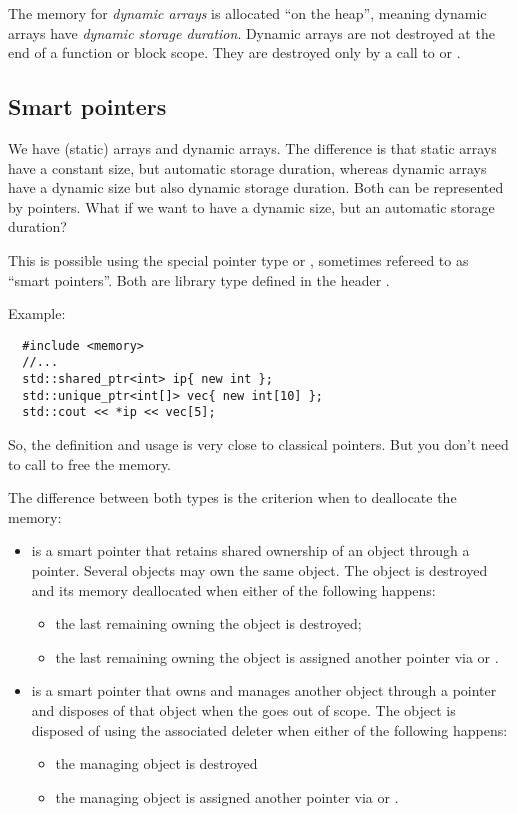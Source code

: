 The memory for \emph{dynamic arrays} is allocated ``on the heap'', meaning dynamic arrays have \emph{dynamic storage duration}. Dynamic arrays are not destroyed at
the end of a function or block scope. They are destroyed only by a call to  or .


\subsection{Smart pointers}
We have (static) arrays and dynamic arrays. The difference is that static arrays have a constant size, but automatic storage duration, whereas dynamic arrays
have a dynamic size but also dynamic storage duration. Both can be represented by pointers. What if we want to have a dynamic size, but an automatic
storage duration?

This is possible using the special pointer type  or , sometimes refereed to as ``smart pointers''. Both are library
type defined in the header .

Example:
\begin{verbatim}
  #include <memory>
  //...
  std::shared_ptr<int> ip{ new int };
  std::unique_ptr<int[]> vec{ new int[10] };
  std::cout << *ip << vec[5];
\end{verbatim}
%
So, the definition and usage is very close to classical pointers. But you don't need to call  to free the memory.

The difference between both types is the criterion when to deallocate the memory:
\begin{itemize}
  \item {} is a smart pointer that retains shared ownership of an object through a pointer. Several  objects may own the
  same object. The object is destroyed and its memory deallocated when either of the following happens:
  \begin{itemize}
    \item the last remaining  owning the object is destroyed;
    \item the last remaining  owning the object is assigned another pointer via  or .
  \end{itemize}

  \item {} is a smart pointer that owns and manages another object through a pointer and disposes of that object when the
   goes out of scope. The object is disposed of using the associated deleter when either of the following happens:
  \begin{itemize}
    \item the managing  object is destroyed
    \item the managing  object is assigned another pointer via  or .
  \end{itemize}
\end{itemize}

